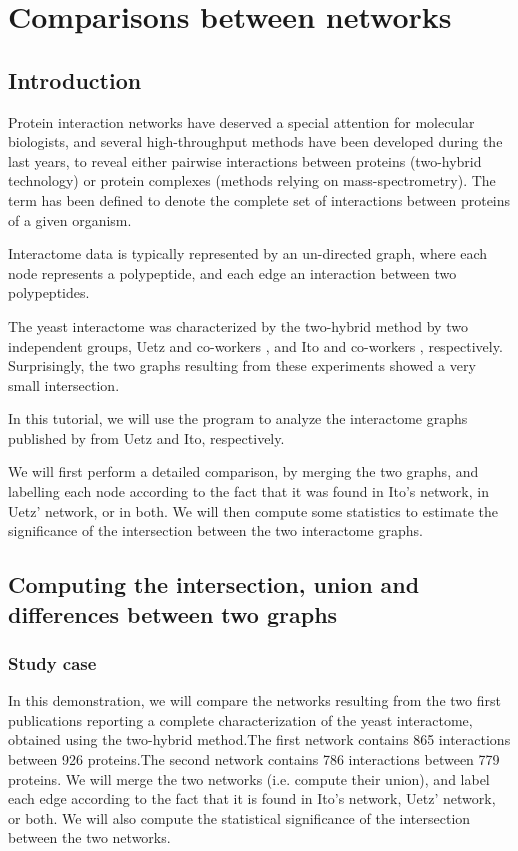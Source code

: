 \chapter{Comparisons between networks}

\section{Introduction}

Protein interaction networks have deserved a special attention for
molecular biologists, and several high-throughput methods have been
developed during the last years, to reveal either pairwise
interactions between proteins (two-hybrid technology) or protein
complexes (methods relying on mass-spectrometry). The term
 has been defined to denote the complete set of
interactions between proteins of a given organism.

Interactome data is typically represented by an un-directed graph,
where each node represents a polypeptide, and each edge an interaction
between two polypeptides.

The yeast interactome was characterized by the two-hybrid method by
two independent groups, Uetz and co-workers \cite{Uetz:2000}, and Ito
and co-workers \cite{Ito:2001}, respectively. Surprisingly, the two
graphs resulting from these experiments showed a very small
intersection.

In this tutorial, we will use the program  to
analyze the interactome graphs published by from Uetz and Ito,
respectively.

We will first perform a detailed comparison, by merging the two
graphs, and labelling each node according to the fact that it was
found in Ito's network, in Uetz' network, or in both. We will then
compute some statistics to estimate the significance of the intersection
between the two interactome graphs.

\section{Computing the intersection, union and differences between two graphs}

\subsection{Study case}

In this demonstration, we will compare the networks resulting from the
two first publications reporting a complete characterization of the
yeast interactome, obtained using the two-hybrid method.The first
network \cite{Uetz:2000} contains 865 interactions between 926
proteins.The second network \cite{Ito:2001} contains 786 interactions
between 779 proteins. We will merge the two networks (i.e. compute
their union), and label each edge according to the fact that it is
found in Ito's network, Uetz' network, or both. We will also compute
the statistical significance of the intersection between the two
networks.


